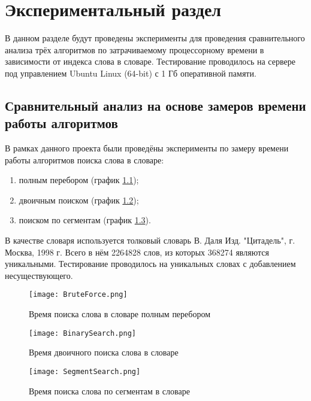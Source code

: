 \chapter{Экспериментальный раздел}
\label{cha:research}
    В данном разделе будут проведены эксперименты для проведения 
    сравнительного анализа трёх алгоритмов по затрачиваемому процессорному 
    времени в зависимости от индекса слова в словаре.
    Тестирование проводилось на сервере
    под управлением Ubuntu Linux (64-bit) с 1 Гб оперативной памяти.

    \section{Сравнительный анализ на основе замеров времени работы алгоритмов}
        В рамках данного проекта были проведёны эксперименты
        по замеру времени работы алгоритмов поиска слова в словаре:
        \begin{enumerate}
            \item полным перебором (график \ref{graph:test:brute-force});
            \item двоичным поиском (график \ref{graph:test:binary});
            \item поиском по сегментам (график \ref{graph:test:segment}).
        \end{enumerate}

        В качестве словаря используется толковый словарь В. Даля Изд. "Цитадель", г. Москва, 1998 г.
        Всего в нём 2264828 слов, из которых 368274 являются уникальными. 
        Тестирование проводилось на уникальных словах с добавлением несуществующего.

        \begin{figure}[h!]
            \centering
                \texttt{[image: BruteForce.png]}
                \caption{Время поиска слова в словаре полным перебором}
                \label{graph:test:brute-force}
        \end{figure}


        
        \begin{figure}[h!]
            \centering
                \texttt{[image: BinarySearch.png]}
                \caption{Время двоичного поиска слова в словаре}
                \label{graph:test:binary}
        \end{figure}

        \begin{figure}[h!]
            \centering
                \texttt{[image: SegmentSearch.png]}
                \caption{Время поиска слова по сегментам в словаре}
                \label{graph:test:segment}
        \end{figure}

